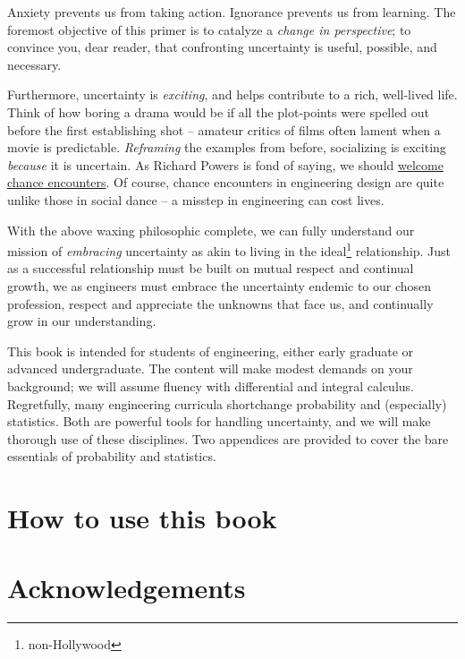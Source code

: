 \documentclass[../primer.tex]{subfiles}
\begin{document}
Anxiety prevents us from taking action. Ignorance prevents us from learning. The
foremost objective of this primer is to catalyze a \emph{change in perspective};
to convince you, dear reader, that confronting uncertainty is useful, possible,
and necessary.

Furthermore, uncertainty is \emph{exciting}, and helps contribute to a rich,
well-lived life. Think of how boring a drama would be if all the plot-points
were spelled out before the first establishing shot -- amateur critics of films
often lament when a movie is predictable. \emph{Reframing} the examples from
before, socializing is exciting \emph{because} it is uncertain. As Richard
Powers is fond of saying, we should
\href{https://socialdance.stanford.edu/Syllabi/vertlateral.htm}{welcome chance
  encounters}. Of course, chance encounters in engineering design are quite
unlike those in social dance -- a misstep in engineering can cost lives.

With the above waxing philosophic complete, we can fully understand our mission
of \emph{embracing} uncertainty as akin to living in the
ideal\footnote{non-Hollywood} relationship. Just as a successful relationship
must be built on mutual respect and continual growth, we as engineers must
embrace the uncertainty endemic to our chosen profession, respect and appreciate
the unknowns that face us, and continually grow in our understanding.

This book is intended for students of engineering, either early graduate or
advanced undergraduate. The content will make modest demands on your background;
we will assume fluency with differential and integral calculus. Regretfully,
many engineering curricula shortchange probability and (especially) statistics.
Both are powerful tools for handling uncertainty, and we will make thorough use
of these disciplines. Two appendices are provided to cover the bare essentials
of probability and statistics.

\section{How to use this book}

\section{Acknowledgements}
\end{document}
